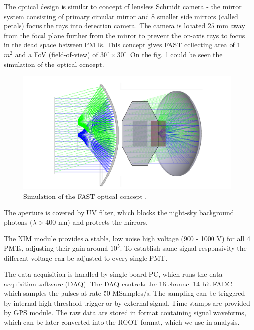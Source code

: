 \par
The optical design is similar to concept of lensless Schmidt camera - the mirror system consisting of primary circular mirror and 8 smaller side mirrors (called petals) focus the rays into detection camera. The camera is located 25 mm away from the focal plane further from the mirror to prevent the on-axis rays to focus in the dead space between PMTs. This concept gives FAST collecting area of 1 $m^2$ and a FoV (field-of-view) of $30^{\circ} \times 30^{\circ}$. On the fig. \ref{FASTConc} could be seen the simulation of the optical concept.



\begin{figure}[H]
 \centering
 \includegraphics[scale = 0.2]{./pictures/FASTfocusing}
 \caption{Simulation of the FAST optical concept \cite{Mandat_2017}.}
 \label{FASTConc}
 
\end{figure}


\par
The aperture is covered by UV filter, which blocks the night-sky background photons ($\lambda > 400$ nm) and protects the mirrors.


\par
The NIM module provides a stable, low noise high voltage (900 - 1000 V) for all 4 PMTs, adjusting their gain around $10^5$. To establish same signal responsivity the different voltage can be adjusted to every single PMT.
\par
The data acquisition is handled by single-board PC, which runs the data acquisition software (DAQ). The DAQ controls the 16-channel 14-bit FADC, which samples the pulses at rate 50 MSamples/s. The sampling can be triggered by internal high-threshold trigger or by external signal. Time stamps are provided by GPS module. The raw data are stored in format containing signal waveforms, which can be later converted into the ROOT format, which we use in analysis.
